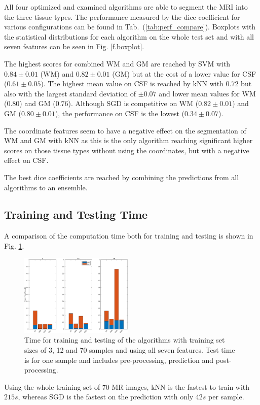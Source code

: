 \documentclass[journal]{IEEEtran}
\begin{document}
All four optimized and examined algorithms are able to segment the MRI into the three tissue types. The performance measured by the dice coefficient for various configurations can be found in Tab.~(\ref{tab:perf_compare}). Boxplots with the statistical distributions for each algorithm on the whole test set and with all seven features can be seen in Fig. \ref{f.boxplot}.

The highest scores for combined WM and GM are reached by SVM with $0.84 \pm 0.01$ (WM) and $0.82 \pm 0.01$ (GM) but at the cost of a lower value for CSF ($0.61 \pm 0.05$). The highest mean value on CSF is reached by kNN with $0.72$ but also with the largest standard deviation of $\pm 0.07$ and lower mean values for WM ($0.80$) and GM ($0.76$). Although SGD is competitive on WM ($0.82 \pm 0.01$) and GM ($0.80 \pm 0.01$), the performance on CSF is the lowest ($0.34 \pm 0.07$).

The coordinate features seem to have a negative effect on the segmentation of WM and GM with kNN as this is the only algorithm reaching significant higher scores on those tissue types without using the coordinates, but with a negative effect on CSF.

The best dice coefficients are reached by combining the predictions from all algorithms to an ensemble.

\subsection{Training and Testing Time}
A comparison of the computation time both for training and testing is shown in Fig. \ref{f.runtimebarplot}.
\begin{figure}
	\centering
	\includegraphics[width=0.48\textwidth]{images/runtimes}
	\caption{Time for training and testing of the algorithms with training set sizes of 3, 12 and 70 samples and using all seven features. Test time is for one sample and includes pre-processing, prediction and post-processing.}\label{f.runtimebarplot}
\end{figure}
Using the whole training set of 70 MR images, kNN is the fastest to train with $215s$, whereas SGD is the fastest on the prediction with only $42s$ per sample.
\end{document}
